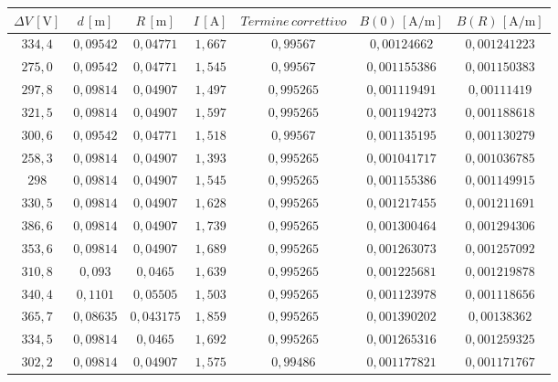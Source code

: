\documentclass[]{article}
\begin{document}
    \begin{table}
        \centering

    \begin{tabular}{||c|c|c|c|c|c|c||}
        \hline
        $\Delta V\, [\text{V}] $ & $d\, [\text{m}] $ & $R\, [\text{m}] $ & $I\, [\text{A}] $ & $Termine \, correttivo $ & $B(0)\, [\text{A/m}] $ & $B(R)\, [\text{A/m}] $\\
        \hline\hline


 
        $334,4$ & $0,09542$ & $0,04771 $ & $1,667$ & $0,99567 $ & $0,00124662 $ & $0,001241223$ \\\hline
        $275,0$ & $0,09542$ & $0,04771 $ & $1,545$ & $0,99567 $ & $0,001155386$ & $0,001150383$ \\\hline
        $297,8$ & $0,09814$ & $0,04907 $ & $1,497$ & $0,995265$ & $0,001119491$ & $0,00111419 $ \\\hline
        $321,5$ & $0,09814$ & $0,04907 $ & $1,597$ & $0,995265$ & $0,001194273$ & $0,001188618$ \\\hline
        $300,6$ & $0,09542$ & $0,04771 $ & $1,518$ & $0,99567 $ & $0,001135195$ & $0,001130279$ \\\hline
        $258,3$ & $0,09814$ & $0,04907 $ & $1,393$ & $0,995265$ & $0,001041717$ & $0,001036785$ \\\hline
        $298  $ & $0,09814$ & $0,04907 $ & $1,545$ & $0,995265$ & $0,001155386$ & $0,001149915$ \\\hline
        $330,5$ & $0,09814$ & $0,04907 $ & $1,628$ & $0,995265$ & $0,001217455$ & $0,001211691$ \\\hline
        $386,6$ & $0,09814$ & $0,04907 $ & $1,739$ & $0,995265$ & $0,001300464$ & $0,001294306$ \\\hline
        $353,6$ & $0,09814$ & $0,04907 $ & $1,689$ & $0,995265$ & $0,001263073$ & $0,001257092$ \\\hline
        $310,8$ & $0,093  $ & $0,0465  $ & $1,639$ & $0,995265$ & $0,001225681$ & $0,001219878$ \\\hline
        $340,4$ & $0,1101 $ & $0,05505 $ & $1,503$ & $0,995265$ & $0,001123978$ & $0,001118656$ \\\hline
        $365,7$ & $0,08635$ & $0,043175$ & $1,859$ & $0,995265$ & $0,001390202$ & $0,00138362 $ \\\hline
        $334,5$ & $0,09814$ & $0,0465  $ & $1,692$ & $0,995265$ & $0,001265316$ & $0,001259325$ \\\hline
        $302,2$ & $0,09814$ & $0,04907 $ & $1,575$ & $0,99486 $ & $0,001177821$ & $0,001171767$ \\\hline

\end{tabular}
\end{table}
\end{document}
